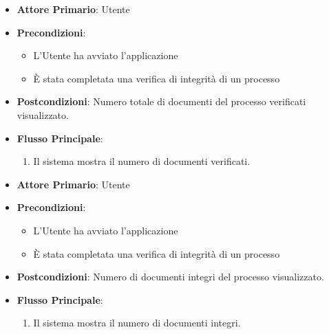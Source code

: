 \begin{itemize}
    \item \textbf{Attore Primario}: Utente
    \item \textbf{Precondizioni}: 
        \begin{itemize}
            \item L'Utente ha avviato l'applicazione
            \item È stata completata una verifica di integrità di un processo            
        \end{itemize} 
    \item \textbf{Postcondizioni}: Numero totale di documenti del processo verificati visualizzato.     
    \item \textbf{Flusso Principale}:
        \begin{enumerate}
            \item Il sistema mostra il numero di documenti verificati.
        \end{enumerate}
\end{itemize}

\begin{itemize}
    \item \textbf{Attore Primario}: Utente
    \item \textbf{Precondizioni}: 
        \begin{itemize}
            \item L'Utente ha avviato l'applicazione
            \item È stata completata una verifica di integrità di un processo
            
        \end{itemize} 
    \item \textbf{Postcondizioni}: Numero di documenti integri del processo visualizzato.     
    \item \textbf{Flusso Principale}:
        \begin{enumerate}
            \item Il sistema mostra il numero di documenti integri.
        \end{enumerate}
\end{itemize}

